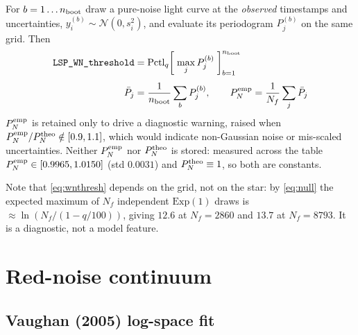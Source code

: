 \documentclass[11pt]{article}
\begin{document}
For $b = 1 \ldots n_{\rm boot}$ draw a pure-noise light curve at the \emph{observed}
timestamps and uncertainties, $y_i^{(b)} \sim \mathcal{N}(0, s_i^2)$, and evaluate its
periodogram $P_j^{(b)}$ on the same grid. Then
%
\begin{align}
  \texttt{LSP\_WN\_threshold}
    &= \mathrm{Pctl}_{q}\!\left[\;\max_j P_j^{(b)} \;\right]_{b=1}^{n_{\rm boot}}
  \label{eq:wnthresh}\\[4pt]
  \bar{P}_j &= \frac{1}{n_{\rm boot}}\sum_{b} P_j^{(b)},
  \qquad
  P_N^{\rm emp} = \frac{1}{N_f}\sum_j \bar{P}_j
  \label{eq:pnemp}
\end{align}
%
$P_N^{\rm emp}$ is retained only to drive a diagnostic warning, raised when
$P_N^{\rm emp}/P_N^{\rm theo} \notin [0.9, 1.1]$, which would indicate non-Gaussian noise
or mis-scaled uncertainties. Neither $P_N^{\rm emp}$ nor $P_N^{\rm theo}$ is stored:
measured across the table $P_N^{\rm emp} \in [0.9965, 1.0150]$ (std $0.0031$) and
$P_N^{\rm theo} \equiv 1$, so both are constants.

Note that \eqref{eq:wnthresh} depends on the grid, not on the star: by \eqref{eq:null}
the expected maximum of $N_f$ independent $\mathrm{Exp}(1)$ draws is
$\approx \ln(N_f/(1-q/100))$, giving $12.6$ at $N_f = 2860$ and $13.7$ at $N_f = 8793$.
It is a diagnostic, not a model feature.

\section{Red-noise continuum}

\subsection{Vaughan (2005) log-space fit}
\end{document}
